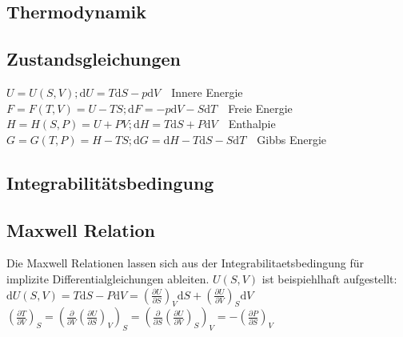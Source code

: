 \documentclass[8pt,a4paper]{extarticle}
\newcommand{\frml}[2]{$#1$~\hfill~#2\\}
\newcommand{\pder}[2]{\frac{\partial#1}{\partial#2}}
\newcommand{\pderc}[3]{\left(\frac{\partial#1}{\partial#2}\right)_{#3}}
\newcommand{\totd}[1]{\mathrm{d}#1}
\begin{document}
\begin{multicols}{3}
\section{Thermodynamik}
\subsection{Zustandsgleichungen}
\frml{U = U(S,V); \mathrm{d}U = T\mathrm{d}S-p\mathrm{d}V}{Innere Energie}
\frml{F = F(T,V) = U - TS; \mathrm{d}F = -p\mathrm{d}V-S\mathrm{d}T}{Freie Energie}
\frml{H = H(S,P) = U + PV; \mathrm{d}H = T\mathrm{d}S +P\mathrm{d}V}{Enthalpie}
\frml{G = G(T,P) = H - TS; \mathrm{d}G = \mathrm{d}H - T\mathrm{d}S - S\mathrm{d}T}{Gibbs Energie}
\subsection{Integrabilit\"atsbedingung}
\subsection{Maxwell Relation}
Die Maxwell Relationen lassen sich aus der Integrabilitaetsbedingung f\"ur implizite Differentialgleichungen ableiten.
$U(S,V)$ ist beispiehlhaft aufgestellt:\\
\frml{\totd{U(S,V)} = T\totd{S} - P\totd{V} = \pderc{U}{S}{V}\totd{S} + \pderc{U}{V}{S}\totd{V}}{}
\frml{\pderc{T}{V}{S} = \left(\pder{}{V}\pderc{U}{S}{V}\right)_S = \left(\pder{}{S}\pderc{U}{V}{S}\right)_V = -\pderc{P}{S}{V}}{}
\end{multicols}
\end{document}

